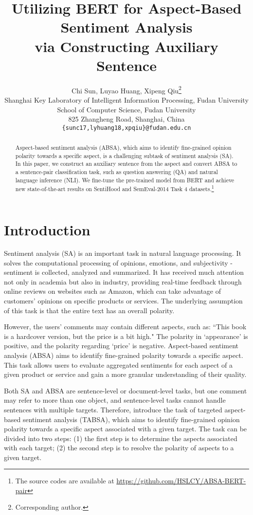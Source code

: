 \documentclass[11pt,a4paper]{article}
\title{Utilizing BERT for Aspect-Based Sentiment Analysis \\via Constructing Auxiliary Sentence}
\author{Chi Sun, Luyao Huang, Xipeng Qiu\thanks{{ }{ }Corresponding author.}\\
	Shanghai Key Laboratory of Intelligent Information Processing, Fudan University\\
	School of Computer Science, Fudan University\\
	825 Zhangheng Road, Shanghai, China\\
	{\tt \{sunc17,lyhuang18,xpqiu\}@fudan.edu.cn} \\}
\date{}
\theoremstyle{definition}
\begin{document}
	\maketitle
	\begin{abstract}
	Aspect-based sentiment analysis (ABSA), which aims to identify fine-grained opinion polarity towards a specific aspect, is a challenging subtask of sentiment analysis (SA). In this paper, we construct an auxiliary sentence from the aspect and convert ABSA to a sentence-pair classification task, such as question answering (QA) and natural language inference (NLI). We fine-tune the pre-trained model from BERT and achieve new state-of-the-art results on SentiHood and SemEval-2014 Task 4 datasets.\footnote{The source codes are available at \url{https://github.com/HSLCY/ABSA-BERT-pair}}
	\end{abstract}
	
	\section{Introduction}
	Sentiment analysis (SA) is an important task in natural language processing. It solves the computational processing of opinions, emotions, and subjectivity - sentiment is collected, analyzed and summarized. It has received much attention not only in academia but also in industry, providing real-time feedback through online reviews on websites such as Amazon, which can take advantage of customers' opinions on specific products or services. The underlying assumption of this task is that the entire text has an overall polarity.
	
	However, the users' comments may contain different aspects, such as: ``This book is a hardcover version, but the price is a bit high." The polarity in `appearance' is positive, and the polarity regarding `price' is negative. Aspect-based sentiment analysis (ABSA) \cite{jo2011aspect,S14-2004,pontiki2015semeval,pontiki2016semeval} aims to identify fine-grained polarity towards a specific aspect. This task allows users to evaluate aggregated sentiments for each aspect of a given product or service and gain a more granular understanding of their quality.
	
	Both SA and ABSA are sentence-level or document-level tasks, but one comment may refer to more than one object, and sentence-level tasks cannot handle sentences with multiple targets. Therefore, \citet{saeidi2016sentihood} introduce the task of targeted aspect-based sentiment analysis (TABSA), which aims to identify fine-grained opinion polarity towards a specific aspect associated with a given target. The task can be divided into two steps: (1) the first step is to determine the aspects associated with each target; (2) the second step is to resolve the polarity of aspects to a given target.
	
\end{document}
